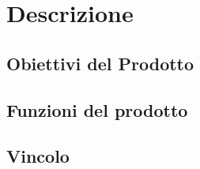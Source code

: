\chapter{Descrizione}

\section{Obiettivi del Prodotto}

\section{Funzioni del prodotto}

\section{Vincolo}

